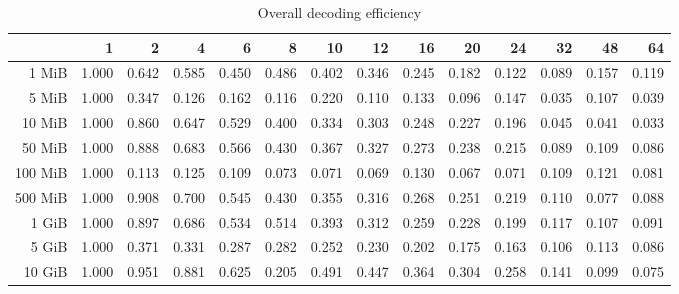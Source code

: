 \begin{table}[!h]
	\centering
	\caption{Overall decoding efficiency}
	\begin{tabular}{rrrrrrrrrrrrrr}
		\toprule
		\diagbox[width=7em]{Sizes}{Threads} & 1  &    2  &    4  &    6  &    8  &    10 &    12 &    16 &    20 &    24 &    32 &    48 &    64 \\
		\midrule
		1 MiB   & 1.000 & 0.642 & 0.585 & 0.450 & 0.486 & 0.402 & 0.346 & 0.245 & 0.182 & 0.122 & 0.089 & 0.157 & 0.119 \\
		5 MiB   & 1.000 & 0.347 & 0.126 & 0.162 & 0.116 & 0.220 & 0.110 & 0.133 & 0.096 & 0.147 & 0.035 & 0.107 & 0.039 \\
		10 MiB  & 1.000 & 0.860 & 0.647 & 0.529 & 0.400 & 0.334 & 0.303 & 0.248 & 0.227 & 0.196 & 0.045 & 0.041 & 0.033 \\
		50 MiB  & 1.000 & 0.888 & 0.683 & 0.566 & 0.430 & 0.367 & 0.327 & 0.273 & 0.238 & 0.215 & 0.089 & 0.109 & 0.086 \\
		100 MiB & 1.000 & 0.113 & 0.125 & 0.109 & 0.073 & 0.071 & 0.069 & 0.130 & 0.067 & 0.071 & 0.109 & 0.121 & 0.081 \\
		500 MiB & 1.000 & 0.908 & 0.700 & 0.545 & 0.430 & 0.355 & 0.316 & 0.268 & 0.251 & 0.219 & 0.110 & 0.077 & 0.088 \\
		1 GiB   & 1.000 & 0.897 & 0.686 & 0.534 & 0.514 & 0.393 & 0.312 & 0.259 & 0.228 & 0.199 & 0.117 & 0.107 & 0.091 \\
		5 GiB   & 1.000 & 0.371 & 0.331 & 0.287 & 0.282 & 0.252 & 0.230 & 0.202 & 0.175 & 0.163 & 0.106 & 0.113 & 0.086 \\
		10 GiB  & 1.000 & 0.951 & 0.881 & 0.625 & 0.205 & 0.491 & 0.447 & 0.364 & 0.304 & 0.258 & 0.141 & 0.099 & 0.075 \\
		\bottomrule
	\end{tabular}
\end{table}

